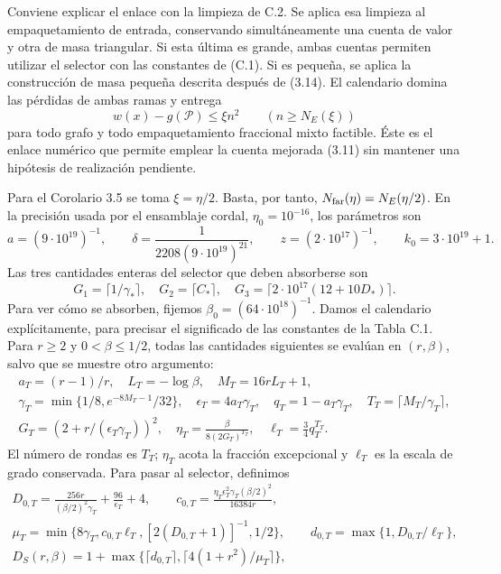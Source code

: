 \documentclass[spanish,11pt,a4paper]{article}
\begin{document}
Conviene explicar el enlace con la limpieza de C.2. Se aplica esa limpieza al empaquetamiento de entrada, conservando simultáneamente una cuenta de valor y otra de masa triangular. Si esta última es grande, ambas cuentas permiten utilizar el selector con las constantes de (C.1). Si es pequeña, se aplica la construcción de masa pequeña descrita después de (3.14). El calendario domina las pérdidas de ambas ramas y entrega \[
w(x)-g(\mathcal P)\le\xi n^2
\qquad(n\ge N_E(\xi))
\tag{C.2}
\] para todo grafo y todo empaquetamiento fraccional mixto factible. Éste es el enlace numérico que permite emplear la cuenta mejorada (3.11) sin mantener una hipótesis de realización pendiente.

Para el Corolario 3.5 se toma \(\xi=\eta/2\). Basta, por tanto, \(N_{\rm far}(\eta)=N_E(\eta/2)\). En la precisión usada por el ensamblaje cordal, \(\eta_0=10^{-16}\), los parámetros son \[
a=(9\cdot10^{19})^{-1},\qquad
\delta=\frac1{2208(9\cdot10^{19})^{21}},\qquad
z=(2\cdot10^{17})^{-1},\qquad k_0=3\cdot10^{19}+1.
\] Las tres cantidades enteras del selector que deben absorberse son \[
G_1=\lceil1/\gamma_*\rceil,\quad G_2=\lceil C_*\rceil,\quad
G_3=\lceil2\cdot10^{17}(12+10D_*)\rceil.
\] Para ver cómo se absorben, fijemos \(\beta_0=(64\cdot10^{18})^{-1}\). Damos el calendario explícitamente, para precisar el significado de las constantes de la Tabla C.1. Para \(r\ge2\) y \(0<\beta\le1/2\), todas las cantidades siguientes se evalúan en \((r,\beta)\), salvo que se muestre otro argumento: \[
\begin{gathered}
a_T=(r-1)/r,\quad L_T=-\log\beta,\quad M_T=16rL_T+1,\\
\gamma_T=\min\{1/8,e^{-8M_T-1}/32\},\quad
\epsilon_T=4a_T\gamma_T,\quad q_T=1-a_T\gamma_T,\quad
T_T=\lceil M_T/\gamma_T\rceil,\\
G_T=(2+r/(\epsilon_T\gamma_T))^2,\quad
\eta_T=\frac{\beta}{8(2G_T)^{T_T}},\quad
\ell_T=\frac34q_T^{T_T}.
\end{gathered}
\] El número de rondas es \(T_T\); \(\eta_T\) acota la fracción excepcional y \(\ell_T\) es la escala de grado conservada. Para pasar al selector, definimos \[
\begin{gathered}
D_{0,T}=\frac{256r}{(\beta/2)^2\gamma_T}+\frac{96}{\epsilon_T}+4,\qquad
c_{0,T}=\frac{\eta_T\epsilon_T^2\gamma_T(\beta/2)^2}{16384r},\\
\mu_T=\min\{8\gamma_T,c_{0,T}\ell_T,[2(D_{0,T}+1)]^{-1},1/2\},\qquad
d_{0,T}=\max\{1,D_{0,T}/\ell_T\},\\
D_S(r,\beta)=1+\max\{\lceil d_{0,T}\rceil,\lceil4(1+r^2)/\mu_T\rceil\},\\

\end{gathered}\]
\end{document}
